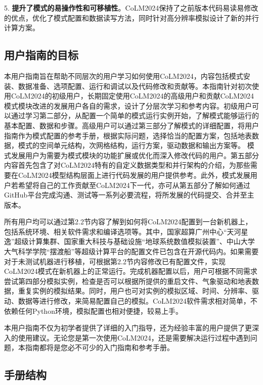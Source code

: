 5. \textbf{提升了模式的易操作性和可移植性}。CoLM2024保持了之前版本代码易读易修改的优点，优化了模式配置和数据读写方法，同时针对高分辨率模拟设计了新的并行计算方案。

\subsection{用户指南的目标}

本用户指南旨在帮助不同层次的用户学习如何使用CoLM2024，内容包括模式安装、数据准备、选项配置、运行和调试以及代码修改和贡献等。本指南针对初次使用CoLM2024的初级用户，长期固定使用CoLM2024的高级用户和贡献CoLM2024模式模块改进的发展用户各自的需求，设计了分层次学习和参考内容。初级用户可以通过学习第二部分，从配置一个简单的模式运行实例开始，了解模式能够运行的基本配置、数据和步骤。高级用户可以通过第三部分了解模式的详细配置，将用户指南作为模式配置的参考手册，根据实际问题，选择恰当的配置方案，包括地表数据，模式的空间单元结构，次网格结构，运行方案，驱动数据和输出方案等。%
模式发展用户为需要为模式模块的功能扩展或优化而深入修改代码的用户。第五部分内容首先包含了对CoLM2024特有的自定义数据类型和并行架构的介绍，为那些需要在CoLM2024模型结构层面上进行代码发展的用户提供参考。此外，模式发展用户若希望将自己的工作贡献至CoLM2024下一代，亦可从第五部分了解如何通过GitHub平台完成沟通、测试等一系列必要流程，将所发展的代码提交、合并至主版本。

所有用户均可以通过第2.2节内容了解到如何将CoLM2024配置到一台新机器上，包括系统环境、相关软件需求和编译选项等。其中，国家超算广州中心“天河星逸”超级计算集群、国家重大科技与基础设施“地球系统数值模拟装置”、中山大学大气科学学院“摆渡船”等超级计算平台的配置文件已包含在开源代码内。如果需要对于未测试机器进行移植，可根据第2.2节内容修改已有配置文件，实现CoLM2024模式在新机器上的正常运行。完成机器配置以后，用户可根据不同需求尝试第四部分模拟实例，检查是否可以根据所提供的重启文件、气象驱动和地表数据，重复实例的模拟结果。同时，用户也可对实例的模拟区域、时间、分辨率、驱动、数据等进行修改，来简易配置自己的模拟。CoLM2024软件需求相对简单，不依赖任何Python环境，模拟配置也相对便捷，较易上手。

本用户指南不仅为初学者提供了详细的入门指导，还为经验丰富的用户提供了更深入的使用建议。无论您是第一次使用CoLM2024，还是需要解决运行过程中遇到问题，本指南都将是您必不可少的入门指南和参考手册。


\subsection{手册结构}

